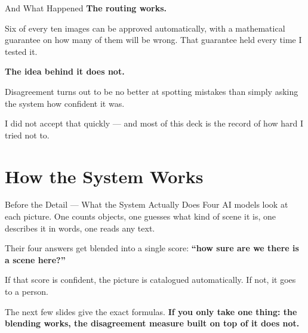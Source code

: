 \documentclass[aspectratio=169,11pt]{beamer}
\begin{document}
\begin{frame}{And What Happened}
\large
\textbf{The routing works.}
\vspace{2mm}

\normalsize Six of every ten images can be approved automatically, with a mathematical guarantee on how many of them will be wrong. That guarantee held every time I tested it.
\vspace{6mm}

\large
\textbf{The idea behind it does not.}
\vspace{2mm}

\normalsize Disagreement turns out to be no better at spotting mistakes than simply asking the system how confident it was.
\vspace{6mm}

\normalsize I did not accept that quickly --- and most of this deck is the record of how hard I tried not to.
\end{frame}


\section{How the System Works}

\begin{frame}{Before the Detail --- What the System Actually Does}
\large
Four AI models look at each picture. One counts objects, one guesses what kind of scene it is, one describes it in words, one reads any text.
\vspace{3mm}

Their four answers get blended into a single score: \textbf{``how sure are we there is a scene here?''}
\vspace{3mm}

If that score is confident, the picture is catalogued automatically. If not, it goes to a person.
\vspace{4mm}

\normalsize The next few slides give the exact formulas. \textbf{If you only take one thing: the blending works, the disagreement measure built on top of it does not.}
\end{frame}
\end{document}
